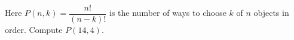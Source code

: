 Here $P(n,k)=\dfrac{n!}{(n-k)!}$ is the number of ways to choose $k$ of $n$ objects in order. Compute $P(14,4)$.
